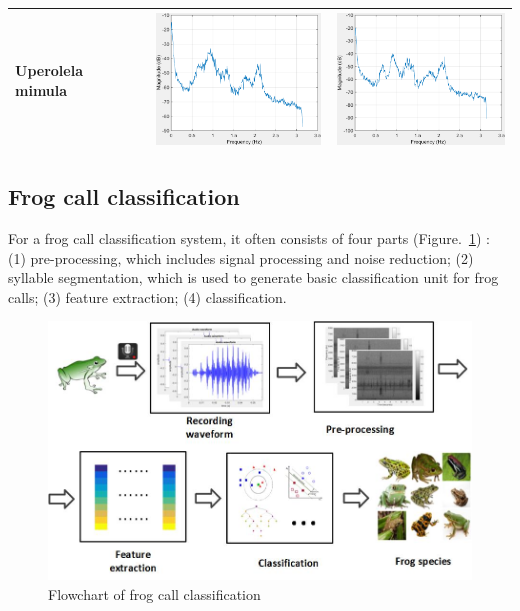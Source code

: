 \begin{table}[htb!]
{\begin{tabular}{lll}
Uperolela mimula            &   \begin{minipage}{.3\textwidth} \includegraphics[width=45mm, height=35mm]{image/Ch1/8_signal.png}  \end{minipage}                              &                                             \begin{minipage}{.3\textwidth} \includegraphics[width=45mm, height=35mm]{image/Ch1/8_noise.png}  \end{minipage} \\ \hline\hline
\end{tabular}
}
\end{table}

\subsection{Frog call classification}

For a frog call classification system, it often consists of four parts (Figure.~\ref{fig:Ch1_flowchart}) : (1) pre-processing, which includes signal processing and noise reduction; (2) syllable segmentation, which is used to generate basic classification unit for frog calls; (3) feature extraction; (4) classification.  



\begin{figure}[htb!]
\centering
\includegraphics[width=\textwidth]{image/Ch1/flowchart.jpg}
\caption[Flowchart of frog call classification]{Flowchart of frog call classification}
\label{fig:Ch1_flowchart}
\end{figure}


